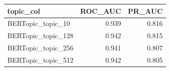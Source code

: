 \begin{tabular}{lrr}
\toprule
topic_col & ROC_AUC & PR_AUC \\
\midrule
BERTopic_topic_10 & 0.939 & 0.816 \\
BERTopic_topic_128 & 0.942 & 0.815 \\
BERTopic_topic_256 & 0.941 & 0.807 \\
BERTopic_topic_512 & 0.942 & 0.805 \\
\bottomrule
\end{tabular}

